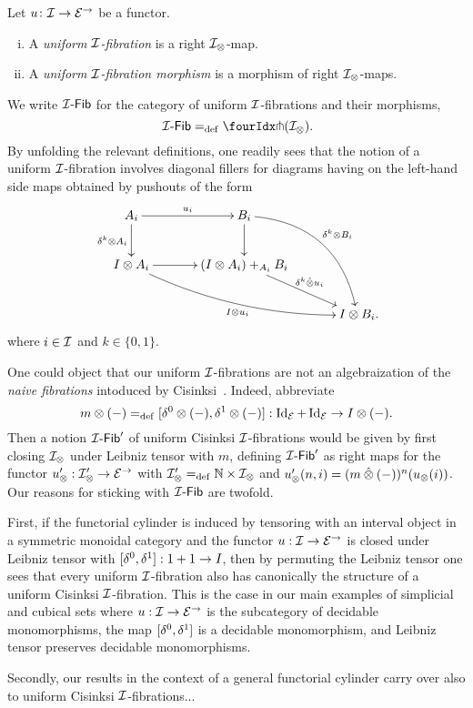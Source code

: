 \documentclass[reqno,10pt,a4paper,oneside,draft]{amsart}
\begin{document}
\begin{definition} \label{def:I-fibration}
Let $u \co \cal{I} \to \catE^\to$ be a functor.
\begin{enumerate}[(i)]
\item A \emph{uniform $\cal{I}$-fibration} is a right $\cal{I}_\otimes$-map.
\item A \emph{uniform $\cal{I}$-fibration morphism} is a morphism of right $\cal{I}_\otimes$-maps.
\end{enumerate}
\end{definition}

We write $\Fib[\cal{I}]$ for the category of uniform $\cal{I}$-fibrations and their morphisms, \ie
\[
\Fib[\cal{I}] \defeq \liftr{(\cal{I}_\otimes)} \rlap{.}
\]
By unfolding the relevant definitions, one readily sees that the notion of a uniform $\cal{I}$-fibration involves diagonal fillers for diagrams having on the left-hand side maps obtained by pushouts of the form
\begin{gather*}
\xymatrix@C=1.2cm{
  A_i \ar[r]^{u_i} \ar[d]_{\kcyl \otimes A_i} & B_i \ar@/^2pc/[ddr]^{\kcyl \otimes B_i} \ar[d] & \\
  \interval \otimes A_i \ar@/_1pc/[drr]_{\interval \otimes u_i} \ar[r] & (\interval \otimes A_i) +_{A_i} B_i \ar[dr]^-{\delta^k \hatotimes u_i} & \\
  & & \interval \otimes B_i
\rlap{.}}
\end{gather*}
where $i \in \cal{I}$ and $k \in \{0, 1 \}$.

\begin{remark}
One could object that our uniform $\cal{I}$-fibrations are not an algebraization of the \emph{naive fibrations} intoduced by Cisinksi~\cite{cisinski-asterisque}.
Indeed, abbreviate
\[
m \otimes (-) \defeq [\lcyl \otimes (-), \rcyl \otimes (-)] : \Id_\catE + \Id_\catE \to \interval \otimes (-)
.\]
Then a notion $\Fib[\cal{I}]'$ of uniform Cisinksi $\cal{I}$-fibrations would be given by first closing $\cal{I}_\otimes$ under Leibniz tensor with $m$, \ie defining $\Fib[\cal{I}]'$ as right maps for the functor $u_\otimes' : \cal{I}_\otimes' \to \catE^\to$ with $\cal{I}_\otimes' \defeq \mathbb{N} \times \cal{I}_\otimes$ and $u_\otimes'(n, i) = (m \hatotimes (-))^n(u_\otimes(i))$.
Our reasons for sticking with $\Fib[\cal{I}]$ are twofold.

First, if the functorial cylinder is induced by tensoring with an interval object in a symmetric monoidal category and the functor $u : \cal{I} \to \catE^\to$ is closed under Leibniz tensor with $[\lcyl, \rcyl] : 1 + 1 \to \interval$, then by permuting the Leibniz tensor one sees that every uniform $\cal{I}$-fibration also has canonically the structure of a uniform Cisinksi $\cal{I}$-fibration.
This is the case in our main examples of simplicial and cubical sets where $u : \cal{I} \to \catE^\to$ is the subcategory of decidable monomorphisms, the map $[\lcyl, \rcyl]$ is a decidable monomorphism, and Leibniz tensor preserves decidable monomorphisms.

Secondly, our results  in the context of a general functorial cylinder carry over also to uniform Cisinksi $\cal{I}$-fibrations...
\end{remark}
\end{document}
